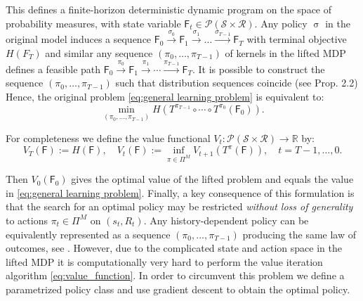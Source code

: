 \documentclass[reqno, 11pt]{amsart}%
\theoremstyle{definition}
\begin{document}
This defines a finite-horizon deterministic dynamic program on the space of probability measures, with state variable $\mathsf F_t \in \mathcal{P}(\mathcal{S} \times \mathcal{R})$. Any policy $\upsigma$ in the original model induces a sequence $\mathsf F_0 \xrightarrow{\sigma_0} \mathsf F_1 \xrightarrow{\sigma_1} \dots \xrightarrow{\sigma_{T-1}} \mathsf F_T$ with terminal objective $H(F_T)$ and similar any sequence $(\pi_0, \ldots, \pi_{T-1})$ of kernels in the lifted MDP defines a feasible path $\mathsf F_0 \xrightarrow{\pi_0} \mathsf F_1 \xrightarrow{\pi_1} \cdots \xrightarrow{\pi_{T-1}} \mathsf F_T$. It is possible to construct the sequence  $(\pi_0, \ldots, \pi_{T-1})$ such that distribution sequences coincide (see \cite{bauerle2025distributionalbellmanequation} Prop. 2.2)
Hence, the original problem \eqref{eq:general learning problem} is equivalent to:
\begin{equation} \label{eq:equivalent_value_function}
\min_{(\pi_0,\ldots,\pi_{T-1})} H\left(T^{\pi_{T-1}} \circ \cdots \circ T^{\pi_0}(\mathsf F_0)\right).
\end{equation}

For completeness we define the value functional $V_t: \mathcal{P}(\mathcal{S} \times \mathcal{R}) \to \mathbb{R}$ by:
\begin{equation}
	\label{eq:value_function}
V_T(\mathsf F) := H(\mathsf F), \quad
V_t(\mathsf F) := \inf_{\pi \in \Pi^M} V_{t+1}\left(T^{\pi}(\mathsf F)\right), \quad t = T-1, \dots, 0.	
\end{equation}

Then $V_0(\mathsf F_0)$ gives the optimal value of the lifted problem and equals the value in \eqref{eq:general learning problem}.
Finally, a key consequence of this formulation is that the search for an optimal policy may be restricted \emph{without loss of generality} to actions $\pi_t \in \Pi^M$ on  $(s_t, R_t)$. Any history-dependent policy can be equivalently represented as a sequence $(\pi_0, \dots, \pi_{T-1})$ producing the same law of outcomes, see \cite[Remark 2.2]{bauerle2025distributionalbellmanequation}.  
However, due to the complicated state and action space in the lifted MDP it is computationally very hard to perform the value iteration algorithm \eqref{eq:value_function}. In order to circumvent this problem we define a parametrized policy class and use gradient descent to obtain the optimal policy.
\end{document}
